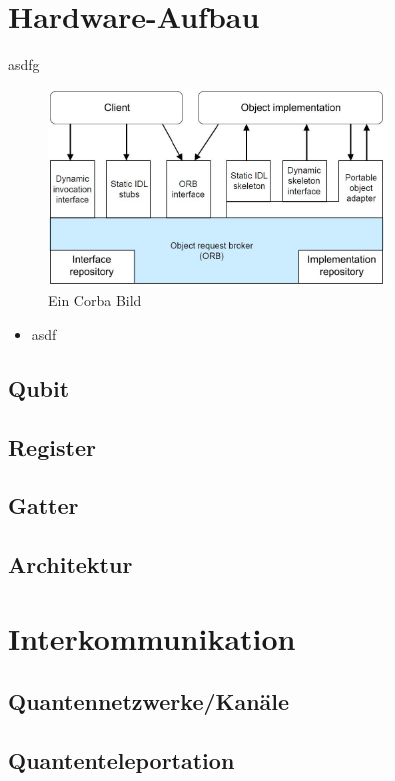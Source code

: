 
\section{Hardware-Aufbau}
\label{sec:Hardware-Aufbau}

asdfg \cite{brands11}

\begin{figure}[!htb]
	\centering\includegraphics[width=0.8\textwidth]{images/corba.jpg}
	\caption{Ein Corba Bild}
	\label{corba}
\end{figure}

\begin{itemize}
    \item asdf
\end{itemize}

	
\subsection{Qubit}
\label{sec:Qubit}


\subsection{Register}
\label{sec:Register}


\subsection{Gatter}
\label{sec:Gatter}


\subsection{Architektur}
\label{sec:Architektur}




\section{Interkommunikation}
\label{sec:Interkommunikation}


\subsection{Quantennetzwerke/Kan\"ale}
\label{sec:Quantennetzwerke/Kanale}


\subsection{Quantenteleportation}
\label{sec:Quantenteleportation}






